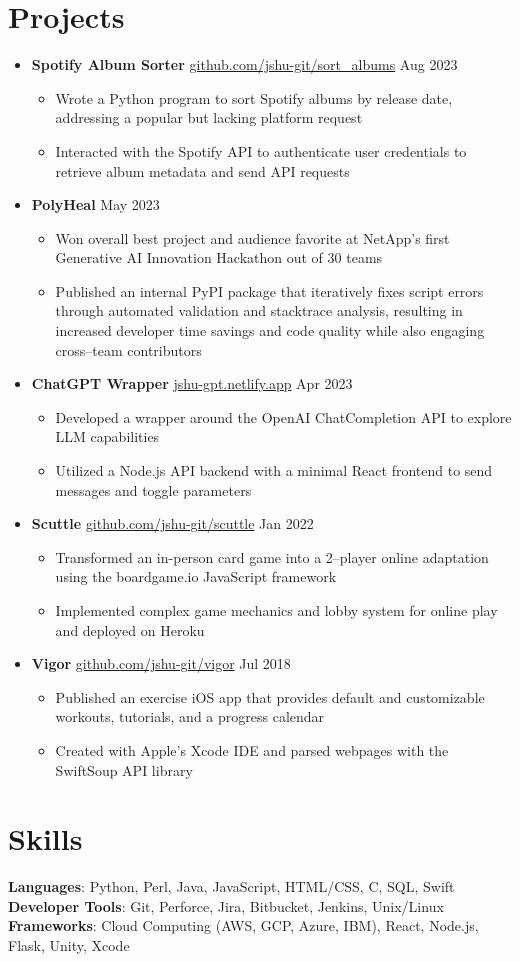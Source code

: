 \documentclass[letterpaper,11pt]{article}
\newcommand{\sectionStart}{\begin{itemize}[leftmargin=0in, label={}]}
\newcommand{\sectionEnd}{\end{itemize}\vspace{-8pt}}
\newcommand{\singleHeading}[2]{
  \item
    #1 \hspace*{\fill} #2 \\
    \vspace{-6pt}
}
\newcommand{\itemListStart}{\begin{itemize}}
\newcommand{\itemListEnd}{\end{itemize}\vspace{-12pt}}
\newcommand{\resumeItem}[1]{
  \item
    \small #1
    \vspace{-3pt} %
}
\begin{document}
  \section{Projects}
    \sectionStart
      \singleHeading{\textbf{Spotify Album Sorter} \href{https://github.com/jshu-git/sort_albums}{github.com/jshu-git/sort\_albums}}{Aug 2023}
        \itemListStart
          \resumeItem{Wrote a Python program to sort Spotify albums by release date, addressing a popular but lacking platform request}
          \resumeItem{Interacted with the Spotify API to authenticate user credentials to retrieve album metadata and send API requests}
        \itemListEnd
      \singleHeading{\textbf{PolyHeal}}{May 2023}
        \itemListStart
          \resumeItem{Won overall best project and audience favorite at NetApp's first Generative AI Innovation Hackathon out of 30 teams}
          \resumeItem{Published an internal PyPI package that iteratively fixes script errors through automated validation and stacktrace analysis, resulting in increased developer time savings and code quality while also engaging cross--team contributors}
        \itemListEnd
      \singleHeading{\textbf{ChatGPT Wrapper} \href{https://jshu-gpt.netlify.app}{jshu-gpt.netlify.app}}{Apr 2023}
        \itemListStart
          \resumeItem{Developed a wrapper around the OpenAI ChatCompletion API to explore LLM capabilities}
          \resumeItem{Utilized a Node.js API backend with a minimal React frontend to send messages and toggle parameters}
        \itemListEnd
      \singleHeading{\textbf{Scuttle} \href{https://github.com/jshu-git/scuttle}{github.com/jshu-git/scuttle}}{Jan 2022}
        \itemListStart
          \resumeItem{Transformed an in-person card game into a 2--player online adaptation using the boardgame.io JavaScript framework}
          \resumeItem{Implemented complex game mechanics and lobby system for online play and deployed on Heroku}
        \itemListEnd
      \singleHeading{\textbf{Vigor} \href{https://github.com/jshu-git/vigor}{github.com/jshu-git/vigor}}{Jul 2018}
        \itemListStart
          \resumeItem{Published an exercise iOS app that provides default and customizable workouts, tutorials, and a progress calendar}
          \resumeItem{Created with Apple’s Xcode IDE and parsed webpages with the SwiftSoup API library}
        \itemListEnd
    \sectionEnd

  \section{Skills}
    \sectionStart
      \small{
        \item{
          \textbf{Languages}{: Python, Perl, Java, JavaScript, HTML/CSS, C, SQL, Swift} \\
          \textbf{Developer Tools}{: Git, Perforce, Jira, Bitbucket, Jenkins, Unix/Linux} \\
          \textbf{Frameworks}{: Cloud Computing (AWS, GCP, Azure, IBM), React, Node.js, Flask, Unity, Xcode} \\
        }
      }
    \sectionEnd
    \vspace{-6pt} %
\end{document}
